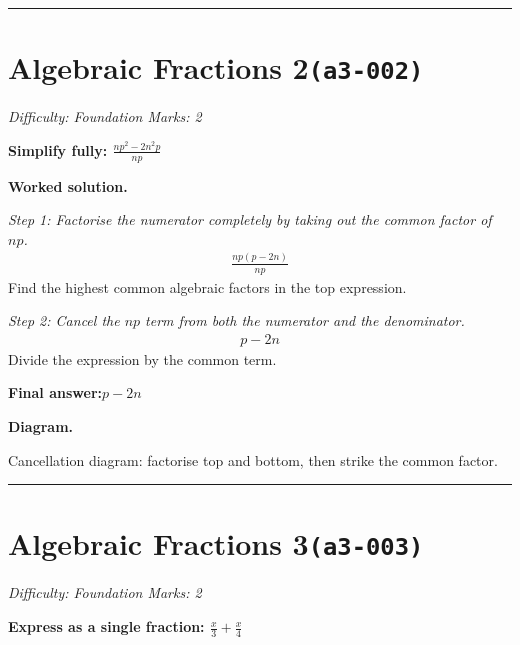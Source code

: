\documentclass[11pt]{article}
\newcommand{\question}[1]{\par\medskip\noindent\textbf{#1}\par}
\begin{document}
\medskip\hrule

\section*{Algebraic Fractions 2\quad\small\texttt{(a3-002)}}
\textit{Difficulty: Foundation \quad\textbar\quad Marks: 2}

\question{Simplify fully: \( \frac{np^2 - 2n^2p}{np} \)}

\textbf{Worked solution.}

\textit{Step 1: Factorise the numerator completely by taking out the common factor of \( np \).}
\[\begin{gathered}
\frac{np(p - 2n)}{np}
\end{gathered}\]
Find the highest common algebraic factors in the top expression.

\textit{Step 2: Cancel the \( np \) term from both the numerator and the denominator.}
\[\begin{gathered}
p - 2n
\end{gathered}\]
Divide the expression by the common term.

\begin{answerbox}
\textbf{Final answer:}\quad \(\displaystyle p - 2n\)
\end{answerbox}
\textbf{Diagram.}

\begin{center}
\end{center}
\small Cancellation diagram: factorise top and bottom, then strike the common factor.\normalsize

\medskip\hrule

\section*{Algebraic Fractions 3\quad\small\texttt{(a3-003)}}
\textit{Difficulty: Foundation \quad\textbar\quad Marks: 2}

\question{Express as a single fraction: \( \frac{x}{3} + \frac{x}{4} \)}
\end{document}
